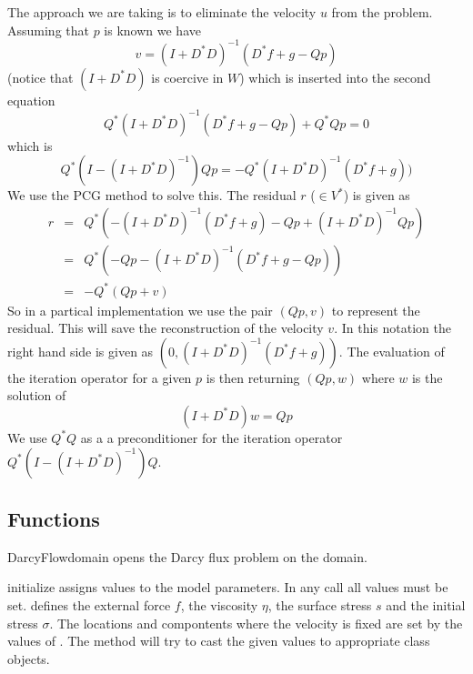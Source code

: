 The approach we are taking is to eliminate the velocity $u$ from the problem. Assuming that $p$ is known we have
\begin{equation}
v= (I+D^*D)^{-1} (D^*f + g - Qp)
\end{equation} 
(notice that $(I+D^*D)$ is coercive in $W$) which is inserted into the second equation
\begin{equation}
Q^* (I+D^*D)^{-1} (D^*f + g - Qp) + Q^* Q p = 0 
\end{equation} 
which is 
\begin{equation}
Q^* ( I - (I+D^*D)^{-1} ) Q p = - Q^* (I+D^*D)^{-1} (D^*f + g) ) 
\end{equation} 
We use the PCG method to solve this. The residual $r$ ($\in V^*$) is given as
\begin{equation}
\begin{array}{rcl}
r & = & Q^*  \left( -(I+D^*D)^{-1} (D^*f + g) - Qp + (I+D^*D)^{-1}Q p \right)\\
& =&  Q^* \left( - Qp - (I+D^*D)^{-1} (D^*f + g - Qp) \right) \\
& =&  - Q^* \left( Qp + v \right)
\end{array}
\end{equation} 
So in a partical implementation we use the pair $(Qp,v)$ to represent the residual. This will save the
reconstruction of the velocity $v$. In this notation the right hand side is given as 
$(0,(I+D^*D)^{-1} (D^*f + g))$. The evaluation of the iteration operator for a given $p$ is then 
returning $(Qp,w)$ where $w$ is the solution of 
\begin{equation}\label{UPDATE W}
(I+D^*D)w = Qp
\end{equation}
We use $Q^*Q$ as a a preconditioner for the iteration operator $Q^* ( I - (I+D^*D)^{-1} ) Q$.

\subsection{Functions}
\begin{classdesc}{DarcyFlow}{domain}
opens the Darcy flux problem on the \Domain domain.
\end{classdesc}

\begin{methoddesc}[DarcyFlow]{initialize}{}
assigns values to the model parameters. In any call all values must be set.
 defines the external force $f$,  the viscosity $\eta$,
 the surface stress $s$ and  the initial stress $\sigma$.
The locations and compontents where the velocity is fixed are set by 
the values of . The method will try to cast the given values to appropriate 
\Data class objects.
\end{methoddesc}


